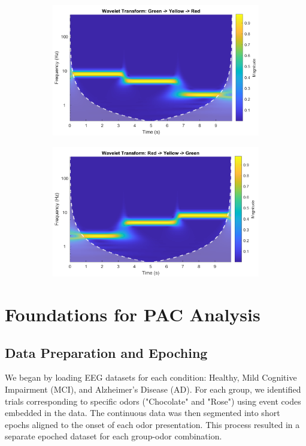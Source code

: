 \documentclass[hidelinks,12pt]{article}
\begin{document}
	
	\begin{figure}[h!]
		\centering
		\begin{subfigure}[b]{0.48\textwidth}
			\centering
			\includegraphics[width=\textwidth]{5}
		\end{subfigure}
		\hfill
		\begin{subfigure}[b]{0.48\textwidth}
			\centering
			\includegraphics[width=\textwidth]{6}
		\end{subfigure}

	\end{figure}
	
	\newpage
	
	\section{Foundations for PAC Analysis}
	\subsection{Data Preparation and Epoching}
	We began by loading EEG datasets for each condition: Healthy, Mild Cognitive Impairment (MCI), and Alzheimer's Disease (AD). For each group, we identified trials corresponding to specific odors ("Chocolate" and "Rose") using event codes embedded in the data. The continuous data was then segmented into short epochs aligned to the onset of each odor presentation. This process resulted in a separate epoched dataset for each group-odor combination.
	
\end{document}
